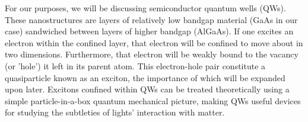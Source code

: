 \indent For our purposes, we will be discussing semiconductor quantum wells (QWs). These nanostructures are layers of relatively low bandgap material (GaAs in our case) sandwiched between layers of higher bandgap (AlGaAs). If one excites an electron within the confined layer, that electron will be confined to move about in two dimensions. Furthermore, that electron will be weakly bound to the vacancy (or 'hole') it left in its parent atom. This electron-hole pair constitute a quasiparticle known as an exciton, the importance of which will be expanded upon later. Excitons confined within QWs can be treated theoretically using a simple particle-in-a-box quantum mechanical picture, making QWs useful devices for studying the subtleties of lights' interaction with matter.




